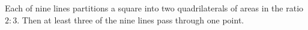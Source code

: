 Each of nine lines partitions a square into two quadrilaterals of areas in the ratio $2 : 3$. Then at least three of the nine lines pass through one point.
